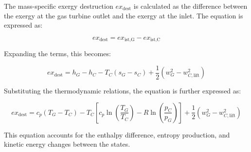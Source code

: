 The mass-specific exergy destruction \( ex_{\text{dest}} \) is calculated as the difference between the exergy at the gas turbine outlet and the exergy at the inlet. The equation is expressed as:  

\[
ex_{\text{dest}} = ex_{\text{ist,G}} - ex_{\text{ist,C}}
\]

Expanding the terms, this becomes:  

\[
ex_{\text{dest}} = h_G - h_C - T_C (s_G - s_C) + \frac{1}{2} \left( w_G^2 - w_{C,\text{lift}}^2 \right)
\]

Substituting the thermodynamic relations, the equation is further expressed as:  

\[
ex_{\text{dest}} = c_p (T_G - T_C) - T_C \left[ c_p \ln \left( \frac{T_G}{T_C} \right) - R \ln \left( \frac{p_C}{p_G} \right) \right] + \frac{1}{2} \left( w_G^2 - w_{C,\text{lift}}^2 \right)
\]  

This equation accounts for the enthalpy difference, entropy production, and kinetic energy changes between the states.
